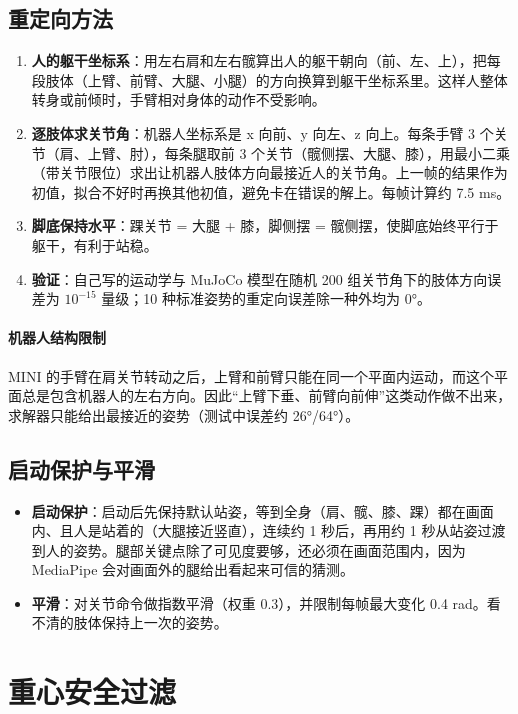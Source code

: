 \documentclass[11pt,a4paper]{article}
\begin{document}
\subsection{重定向方法}
\begin{enumerate}
  \item \textbf{人的躯干坐标系}：用左右肩和左右髋算出人的躯干朝向（前、左、上），把每段肢体（上臂、前臂、大腿、小腿）的方向换算到躯干坐标系里。这样人整体转身或前倾时，手臂相对身体的动作不受影响。
  \item \textbf{逐肢体求关节角}：机器人坐标系是 x 向前、y 向左、z 向上。每条手臂 3 个关节（肩、上臂、肘），每条腿取前 3 个关节（髋侧摆、大腿、膝），用最小二乘（带关节限位）求出让机器人肢体方向最接近人的关节角。上一帧的结果作为初值，拟合不好时再换其他初值，避免卡在错误的解上。每帧计算约 7.5 ms。
  \item \textbf{脚底保持水平}：踝关节 = 大腿 + 膝，脚侧摆 = 髋侧摆，使脚底始终平行于躯干，有利于站稳。
  \item \textbf{验证}：自己写的运动学与 MuJoCo 模型在随机 200 组关节角下的肢体方向误差为 $10^{-15}$ 量级；10 种标准姿势的重定向误差除一种外均为 0°。
\end{enumerate}

\paragraph{机器人结构限制} MINI 的手臂在肩关节转动之后，上臂和前臂只能在同一个平面内运动，而这个平面总是包含机器人的左右方向。因此“上臂下垂、前臂向前伸”这类动作做不出来，求解器只能给出最接近的姿势（测试中误差约 26°/64°）。

\subsection{启动保护与平滑}
\begin{itemize}
  \item \textbf{启动保护}：启动后先保持默认站姿，等到全身（肩、髋、膝、踝）都在画面内、且人是站着的（大腿接近竖直），连续约 1 秒后，再用约 1 秒从站姿过渡到人的姿势。腿部关键点除了可见度要够，还必须在画面范围内，因为 MediaPipe 会对画面外的腿给出看起来可信的猜测。
  \item \textbf{平滑}：对关节命令做指数平滑（权重 0.3），并限制每帧最大变化 0.4 rad。看不清的肢体保持上一次的姿势。
\end{itemize}

\section{重心安全过滤}
\label{sec:balance}
\end{document}
